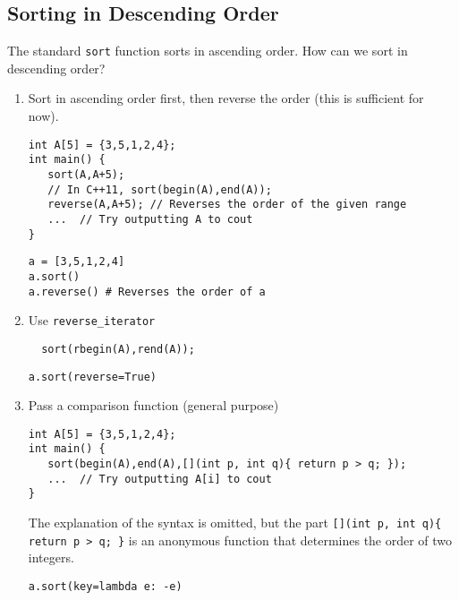 \subsection{Sorting in Descending Order}
The standard \texttt{sort} function sorts in ascending order. How can we sort in descending order?
\begin{enumerate}
\item Sort in ascending order first, then reverse the order (this is sufficient for now).
\begin{cbox}
\begin{verbatim}
int A[5] = {3,5,1,2,4};
int main() {
   sort(A,A+5);
   // In C++11, sort(begin(A),end(A));
   reverse(A,A+5); // Reverses the order of the given range
   ...  // Try outputting A to cout
}
\end{verbatim}
\end{cbox}
\begin{pybox}
\begin{verbatim}
a = [3,5,1,2,4]
a.sort()
a.reverse() # Reverses the order of a
\end{verbatim}
\end{pybox}
\item Use \texttt{reverse\_iterator}
\begin{c14box}[emph={rbegin,rend}]
\begin{verbatim}
  sort(rbegin(A),rend(A));
\end{verbatim}
\end{c14box}
\begin{pybox}
\begin{verbatim}
a.sort(reverse=True)
\end{verbatim}
\end{pybox}
\item Pass a comparison function (general purpose)
\begin{c11box}
\begin{verbatim}
int A[5] = {3,5,1,2,4};
int main() {
   sort(begin(A),end(A),[](int p, int q){ return p > q; });
   ...  // Try outputting A[i] to cout
}
\end{verbatim}
\end{c11box}
The explanation of the syntax is omitted, but the part \texttt{[](int p, int q)\{ return p > q; \}} is an anonymous function that determines the order of two integers.
\begin{pybox}
\begin{verbatim}
a.sort(key=lambda e: -e)
\end{verbatim}
\end{pybox}
\end{enumerate}
